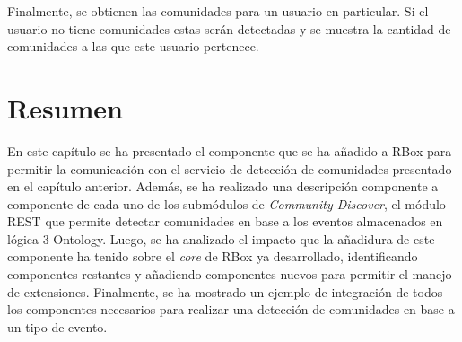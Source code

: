 
Finalmente, se obtienen las comunidades para un usuario en particular. Si el usuario no tiene comunidades estas serán detectadas y se muestra la cantidad de comunidades a las que este usuario pertenece.

\section{Resumen}

En este capítulo se ha presentado el componente que se ha añadido a RBox para permitir la comunicación con el servicio de detección de comunidades presentado en el capítulo anterior. Además, se ha realizado una descripción componente a componente de cada uno de los submódulos de \textit{Community Discover}, el módulo REST que permite detectar comunidades en base a los eventos almacenados en lógica 3-Ontology. Luego, se ha analizado el impacto que la añadidura de este componente ha tenido sobre el \textit{core} de RBox ya desarrollado, identificando componentes restantes y añadiendo componentes nuevos para permitir el manejo de extensiones. Finalmente, se ha mostrado un ejemplo de integración de todos los componentes necesarios para realizar una detección de comunidades en base a un tipo de evento.
